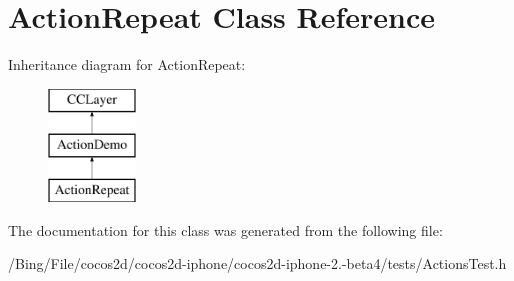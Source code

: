 \hypertarget{interface_action_repeat}{\section{Action\-Repeat Class Reference}
\label{interface_action_repeat}
}
Inheritance diagram for Action\-Repeat\-:\begin{figure}[H]
\begin{center}
\leavevmode
\includegraphics[height=3.000000cm]{interface_action_repeat}
\end{center}
\end{figure}


The documentation for this class was generated from the following file\-:\begin{DoxyCompactItemize}
\item 
/\-Bing/\-File/cocos2d/cocos2d-\/iphone/cocos2d-\/iphone-\/2.-\/beta4/tests/Actions\-Test.\-h\end{DoxyCompactItemize}

